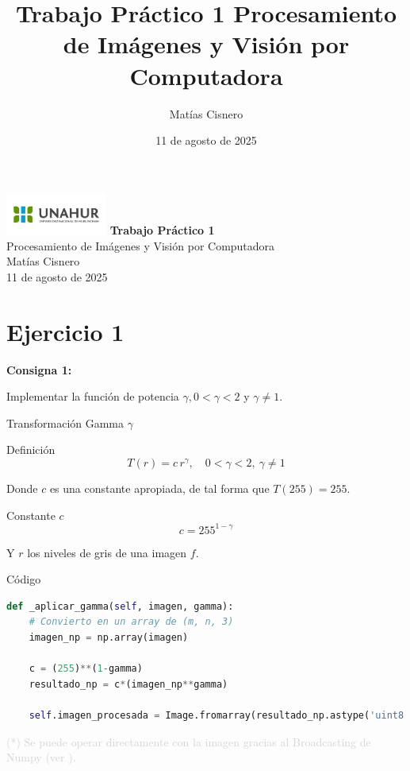 \documentclass{beamer}
\title{Trabajo Práctico 1 Procesamiento de Imágenes y Visión por Computadora}
\author{Matías Cisnero}
\date{11 de agosto de 2025}
\begin{document}
	
\begin{frame}
	\centering
	\includegraphics[width=0.25\textwidth]{UNAHUR.png}
	\vfill
	{\huge \textbf{Trabajo Práctico 1}}\\[0.2cm]
	{\Large Procesamiento de Imágenes y Visión por Computadora}\\
	\vfill
	{\large Matías Cisnero}\\
	{\small 11 de agosto de 2025}
\end{frame}
	
\section{Ejercicio 1}
	
\begin{frame}
	\begin{center}
		\textcolor{unahurverde}{\textbf{Consigna 1:}}
	\end{center}
	\justifying
	
	Implementar la función de potencia $\gamma, 0 < \gamma < 2$ y $\gamma \neq 1$.
\end{frame}

\begin{frame}[fragile]{Transformación Gamma $\gamma$}
	\justifying

	\begin{block}{Definición}
		\[
		T(r) = c \, r^\gamma, \quad 0 < \gamma < 2, \ \gamma \neq 1
		\]
	\end{block}
	
	Donde $c$ es una constante apropiada, de tal forma que $T(255) = 255$.
	
	\begin{block}{Constante $c$}
		\[
		c = 255^{1-\gamma}
		\]
	\end{block}
	
	Y $r$ los niveles de gris de una imagen $f$.
\end{frame}

\begin{frame}[fragile]{Código}
	\justifying
	
	\begin{lstlisting}[language=Python]
def _aplicar_gamma(self, imagen, gamma):
	# Convierto en un array de (m, n, 3)
	imagen_np = np.array(imagen)
			
	c = (255)**(1-gamma)
	resultado_np = c*(imagen_np**gamma)
			
	self.imagen_procesada = Image.fromarray(resultado_np.astype('uint8'))
	\end{lstlisting}
	
 \vfill
	\footnotesize \textcolor{lightgray}{(*) Se puede operar directamente con la imagen gracias al Broadcasting de Numpy (ver \cite{numpy-broadcasting}).}
\end{frame}
\end{document}

